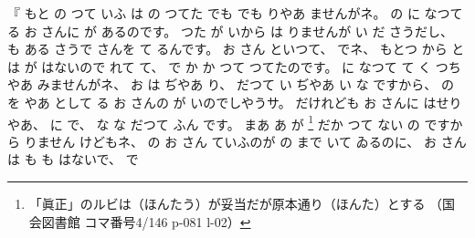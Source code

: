 %
『
もと
の
つて
いふ
は
の
つてた
でも
でも
りやあ
ませんがネ。
%
の
に
なつてる
お
さんに
が
あるのです。
%
つた
が
いから
は
りませんが
い
だ
さうだし、
%
も
ある
さうで
さんを
て
るんです。
%
お
さん
といつて、
%
でネ、
%
もとつ
から
とは
が
はないので
れて
て、
%
で
か
か
つて
つてたのです。
%
に
なつて
て
く
つちやあ
みませんがネ、
%
%
お
は
ぢやあ
り、
%
だつて
い
ぢやあ
い
%
な
ですから、
%
の
を
やあ
として
る
お
さんの
が
いのでしやうサ。
%
だけれども
お
さんに
はせりやあ、
%
に
で、
%
な
な
だつて
ふん
です。
%
まあ
%
あ
が
\footnote{「眞正」のルビは（ほんたう）が妥当だが原本通り（ほんた）とする
（国会図書館 コマ番号4/146 p-081 l-02）}%
だか%
つて
ない
の
ですから
りません
けどもネ、
%
の
お
さん
ていふのが
の
まで
いて
ゐるのに、
%
お
さんは
も
も
はないで、
%
で%
